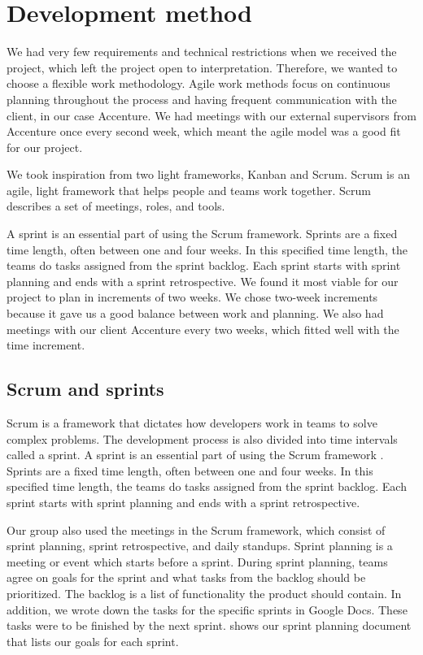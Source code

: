 \section{Development method} \label{sec:dev_method}
We had very few requirements and technical restrictions when we received the project, which left the project open to interpretation. Therefore, we wanted to choose a flexible work methodology. Agile work methods focus on continuous planning throughout the process and having frequent communication with the client, in our case Accenture. We had meetings with our external supervisors from Accenture once every second week, which meant the agile model was a good fit for our project.

We took inspiration from two light frameworks, Kanban and Scrum. Scrum is an agile,  light framework that helps people and teams work together. Scrum describes a set of meetings, roles, and tools. 

A sprint is an essential part of using the Scrum framework. Sprints are a fixed time length, often between one and four weeks. In this specified time length, the teams do tasks assigned from the sprint backlog. Each sprint starts with sprint planning and ends with a sprint retrospective. We found it most viable for our project to plan in increments of two weeks. We chose two-week increments because it gave us a good balance between work and planning. We also had meetings with our client Accenture every two weeks, which fitted well with the time increment.   

\subsection{Scrum and sprints}\label{section:scrum}
Scrum is a framework that dictates how developers work in teams to solve complex problems. The development process is also divided into time intervals called a sprint. A sprint is an essential part of using the Scrum framework \parencite{prosjektveilederen}. Sprints are a fixed time length, often between one and four weeks. In this specified time length, the teams do tasks assigned from the sprint backlog. Each sprint starts with sprint planning and ends with a sprint retrospective.

Our group also used the meetings in the Scrum framework, which consist of sprint planning, sprint retrospective, and daily standups. Sprint planning is a meeting or event which starts before a sprint. During sprint planning, teams agree on goals for the sprint and what tasks from the backlog should be prioritized. The backlog is a list of functionality the product should contain. In addition, we wrote down the tasks for the specific sprints in Google Docs. These tasks were to be finished by the next sprint.  shows our sprint planning document that lists our goals for each sprint.

